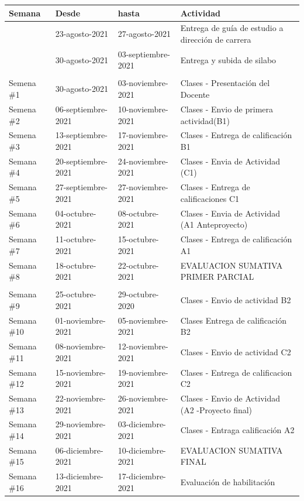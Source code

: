 \documentclass[a4paper,12pt,spanish]{article}
\begin{document}
\begin{center}
\begin{tabular}{|l|l|l|p{10cm}|}
  \hline
  \rowcolor{gray!20}
Semana &  Desde & hasta & Actividad\\
\hline \rowcolor{yellow!20}
       &    23-agosto-2021 & 27-agosto-2021 & Entrega de guía de estudio a dirección de carrera \\ \hline \rowcolor{yellow!20}
       &    30-agosto-2021 & 03-septiembre-2021 & Entrega y subida de silabo \\ \hline \rowcolor{blue!20}
 \multicolumn{4}{|c|}{INICIO PRIMER PARCIAL} \\ \hline \rowcolor{green!20}    
Semena \#1 & 30-agosto-2021 & 03-noviembre-2021 & Clases  - Presentación del Docente\\ \rowcolor{green!20}   
Semena \#2 & 06-septiembre-2021 & 10-noviembre-2021 & Clases - Envio de primera actividad(B1)\\ \rowcolor{green!20}
Semena \#3 & 13-septiembre-2021 & 17-noviembre-2021 & Clases - Entrega de calificación B1 \\   \rowcolor{green!20}
Semana \#4 & 20-septiembre-2021 & 24-noviembre-2021 & Clases - Envia de Actividad (C1)\\  \rowcolor{green!20}
Semana \#5 & 27-septiembre-2021 & 27-noviembre-2021 & Clases - Entrega de calificaciones  C1\\ \rowcolor{green!20}
Semana \#6 & 04-octubre-2021 & 08-octubre-2021 & Clases - Envia de Actividad (A1 Anteproyecto) \\  \rowcolor{green!20}
Semana \#7 & 11-octubre-2021 & 15-octubre-2021 & Clases - Entrega de calificación A1  \\ \rowcolor{green!20}
  Semana \#8 & 18-octubre-2021 & 22-octubre-2021 & EVALUACION SUMATIVA PRIMER PARCIAL\\ \hline \rowcolor{blue!20}
 \multicolumn{4}{|c|}{INICIO SEGUNDO PARCIAL} \\ \hline \rowcolor{green!20}
Semana \#9 & 25-octubre-2021 & 29-octubre-2020 & Clases - Envio de actividad B2\\ \rowcolor{green!20} 
Semana \#10  & 01-noviembre-2021 & 05-noviembre-2021 & Clases Entrega de calificación B2\\ \rowcolor{green!20}
Semana \#11 &  08-noviembre-2021 & 12-noviembre-2021 & Clases - Envio de actividad C2 \\ \rowcolor{green!20}
Semana \#12 &  15-noviembre-2021 & 19-noviembre-2021 & Clases - Entrega de calificacion C2\\   \rowcolor{green!20}
Semana \#13 &  22-noviembre-2021 & 26-noviembre-2021 & Clases - Envio de Actividad (A2 -Proyecto final)\\ \rowcolor{green!20}
Semana \#14 &  29-noviembre-2021 & 03-diciembre-2021 & Clases - Entraga calificación A2\\ \rowcolor{red!20}
Semana \#15 &  06-diciembre-2021 & 10-diciembre-2021 & EVALUACION SUMATIVA FINAL\\ \hline \rowcolor{red!20}
Semana \#16 &  13-diciembre-2021 & 17-diciembre-2021 & Evaluación de habilitación\\ \hline
\end{tabular}
\end{center}
\end{document}
